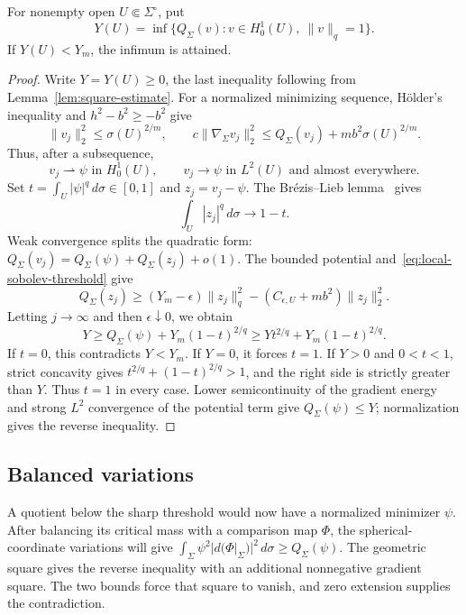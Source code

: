\begin{lemma}
\label{lem:subthreshold-minimizer}
For nonempty open $U\Subset\Sigma^\circ$, put
\[
 Y(U)=\inf\{Q_\Sigma(v):v\in H^1_0(U),\ \|v\|_q=1\}.
\]
If $Y(U)<Y_m$, the infimum is attained.
\end{lemma}

\begin{proof}
Write $Y=Y(U)\ge0$, the last inequality following from
Lemma~\ref{lem:square-estimate}. For a normalized minimizing sequence,
H\"older's inequality and $h^2-b^2\ge-b^2$ give
\begin{equation}
\label{eq:minimizing-sequence-bound}
 \|v_j\|_2^2\le\sigma(U)^{2/m},\qquad
 c\|\nabla_\Sigma v_j\|_2^2
 \le Q_\Sigma(v_j)+mb^2\sigma(U)^{2/m}.
\end{equation}
Thus, after a subsequence,
\[
 v_j\rightharpoonup\psi\text{ in }H^1_0(U),\qquad
 v_j\longrightarrow\psi\text{ in }L^2(U)
 \text{ and almost everywhere}.
\]
Set $t=\int_U|\psi|^q\,d\sigma\in[0,1]$ and $z_j=v_j-\psi$.
The Br\'ezis--Lieb lemma~\cite[Theorem~1]{BrezisLieb1983} gives
\begin{equation}
\label{eq:brezis-lieb-splitting}
 \int_U|z_j|^q\,d\sigma\longrightarrow1-t.
\end{equation}
Weak convergence splits the quadratic form:
$Q_\Sigma(v_j)=Q_\Sigma(\psi)+Q_\Sigma(z_j)+o(1)$.
The bounded potential and~\eqref{eq:local-sobolev-threshold} give
\[
 Q_\Sigma(z_j)\ge
 (Y_m-\epsilon)\|z_j\|_q^2
 -(C_{\epsilon,U}+mb^2)\|z_j\|_2^2.
\]
Letting $j\to\infty$ and then $\epsilon\downarrow0$, we obtain
\begin{equation}
\label{eq:critical-mass-inequality}
 Y\ge Q_\Sigma(\psi)+Y_m(1-t)^{2/q}
 \ge Yt^{2/q}+Y_m(1-t)^{2/q}.
\end{equation}
If $t=0$, this contradicts $Y<Y_m$. If $Y=0$, it forces $t=1$.
If $Y>0$ and $0<t<1$, strict concavity gives
$t^{2/q}+(1-t)^{2/q}>1$, and the right side is strictly greater
than $Y$. Thus $t=1$ in every case. Lower semicontinuity of the
gradient energy and strong $L^2$ convergence of the potential term
give $Q_\Sigma(\psi)\le Y$; normalization gives the reverse inequality.
\end{proof}

\subsection{Balanced variations}

A quotient below the sharp threshold would now have a normalized
minimizer $\psi$. After balancing its critical mass with a comparison
map $\Phi$, the spherical-coordinate variations will give
$\int_\Sigma\psi^2|d(\Phi|_\Sigma)|^2\,d\sigma\ge Q_\Sigma(\psi)$.
The geometric square gives the reverse inequality with an additional
nonnegative gradient square. The two bounds force that square to vanish,
and zero extension supplies the contradiction.

